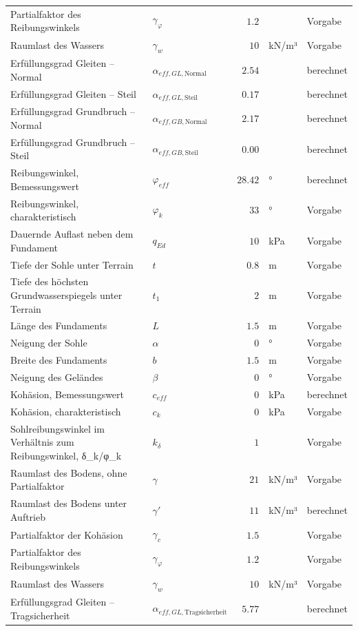 \documentclass[11pt,a4paper]{article}
\begin{document}
\begin{xltabular}{\linewidth}{>{\raggedright\arraybackslash}Xlrll}
Partialfaktor des Reibungswinkels & $\gamma_{\varphi}$ & $1.2$ &  & Vorgabe \\
Raumlast des Wassers & $\gamma_w$ & $10$ & kN/m³ & Vorgabe \\
Erfüllungsgrad Gleiten – Normal & $\alpha_{eff,GL,\text{Normal}}$ & $2.54$ &  & berechnet \\
Erfüllungsgrad Gleiten – Steil & $\alpha_{eff,GL,\text{Steil}}$ & $0.17$ &  & berechnet \\
Erfüllungsgrad Grundbruch – Normal & $\alpha_{eff,GB,\text{Normal}}$ & $2.17$ &  & berechnet \\
Erfüllungsgrad Grundbruch – Steil & $\alpha_{eff,GB,\text{Steil}}$ & $0.00$ &  & berechnet \\
Reibungswinkel, Bemessungswert & $\varphi_{eff}$ & $28.42$ & ° & berechnet \\
Reibungswinkel, charakteristisch & $\varphi_k$ & $33$ & ° & Vorgabe \\
Dauernde Auflast neben dem Fundament & $q_{Ed}$ & $10$ & kPa & Vorgabe \\
Tiefe der Sohle unter Terrain & $t$ & $0.8$ & m & Vorgabe \\
Tiefe des höchsten Grundwasserspiegels unter Terrain & $t_1$ & $2$ & m & Vorgabe \\
Länge des Fundaments & $L$ & $1.5$ & m & Vorgabe \\
Neigung der Sohle & $\alpha$ & $0$ & ° & Vorgabe \\
Breite des Fundaments & $b$ & $1.5$ & m & Vorgabe \\
Neigung des Geländes & $\beta$ & $0$ & ° & Vorgabe \\
Kohäsion, Bemessungswert & $c_{eff}$ & $0$ & kPa & berechnet \\
Kohäsion, charakteristisch & $c_k$ & $0$ & kPa & Vorgabe \\
Sohlreibungswinkel im Verhältnis zum Reibungswinkel, δ\_k/φ\_k & $k_{\delta}$ & $1$ &  & Vorgabe \\
Raumlast des Bodens, ohne Partialfaktor & $\gamma$ & $21$ & kN/m³ & Vorgabe \\
Raumlast des Bodens unter Auftrieb & $\gamma'$ & $11$ & kN/m³ & berechnet \\
Partialfaktor der Kohäsion & $\gamma_c$ & $1.5$ &  & Vorgabe \\
Partialfaktor des Reibungswinkels & $\gamma_{\varphi}$ & $1.2$ &  & Vorgabe \\
Raumlast des Wassers & $\gamma_w$ & $10$ & kN/m³ & Vorgabe \\
Erfüllungsgrad Gleiten – Tragsicherheit & $\alpha_{eff,GL,\text{Tragsicherheit}}$ & $5.77$ &  & berechnet \\

\end{xltabular}
\end{document}
